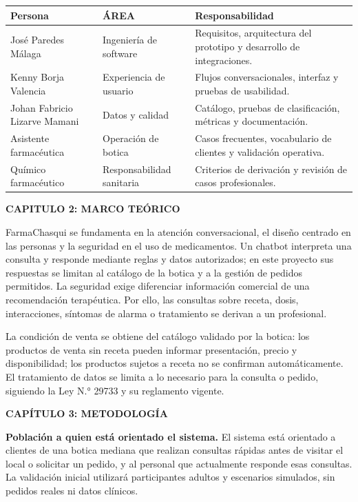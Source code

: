 \documentclass[11pt,a4paper]{article}
\newcommand{\capitulo}[1]{\vspace{1.2em}\noindent\textbf{\large #1}\par\vspace{0.45em}}
\begin{document}
\begin{table}[h!]
\centering
\small
\begin{tabularx}{\textwidth}{p{}p{}Y}
\toprule
\textbf{Persona} & \textbf{ÁREA} & \textbf{Responsabilidad} \\
\midrule
José Paredes Málaga & Ingeniería de software & Requisitos, arquitectura del prototipo y desarrollo de integraciones. \\
Kenny Borja Valencia & Experiencia de usuario & Flujos conversacionales, interfaz y pruebas de usabilidad. \\
Johan Fabricio Lizarve Mamani & Datos y calidad & Catálogo, pruebas de clasificación, métricas y documentación. \\
Asistente farmacéutica & Operación de botica & Casos frecuentes, vocabulario de clientes y validación operativa. \\
Químico farmacéutico & Responsabilidad sanitaria & Criterios de derivación y revisión de casos profesionales. \\
\bottomrule
\end{tabularx}
\end{table}

\capitulo{CAPITULO 2: MARCO TEÓRICO}

FarmaChasqui se fundamenta en la atención conversacional, el diseño centrado en las personas y la seguridad en el uso de medicamentos. Un chatbot interpreta una consulta y responde mediante reglas y datos autorizados; en este proyecto sus respuestas se limitan al catálogo de la botica y a la gestión de pedidos permitidos. La seguridad exige diferenciar información comercial de una recomendación terapéutica. Por ello, las consultas sobre receta, dosis, interacciones, síntomas de alarma o tratamiento se derivan a un profesional.

La condición de venta se obtiene del catálogo validado por la botica: los productos de venta sin receta pueden informar presentación, precio y disponibilidad; los productos sujetos a receta no se confirman automáticamente. El tratamiento de datos se limita a lo necesario para la consulta o pedido, siguiendo la Ley N.° 29733 y su reglamento vigente.

\capitulo{CAPÍTULO 3: METODOLOGÍA}

\textbf{Población a quien está orientado el sistema.} El sistema está orientado a clientes de una botica mediana que realizan consultas rápidas antes de visitar el local o solicitar un pedido, y al personal que actualmente responde esas consultas. La validación inicial utilizará participantes adultos y escenarios simulados, sin pedidos reales ni datos clínicos.
\end{document}
